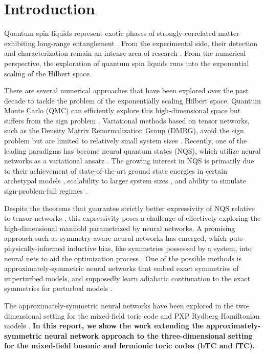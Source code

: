 \documentclass[
  aps,            %
  prl,            %
  reprint,        %
  groupedaddress, %
  amsmath,amssymb,
  floatfix,       %
  nofootinbib,    %
  longbibliography %
]{revtex4-2}
\newcommand{\todo}[1]{\textcolor{red}{\textbf{[TODO: #1]}}}
\begin{document}
\section{Introduction}
Quantum spin liquids represent exotic phases of strongly-correlated matter exhibiting long-range entanglement \cite{kitaev2003,savary2017}. From the experimental side, their detection and characterization remain an intense area of research \cite{satzinger2021,semeghini2021}. From the numerical perspective, the exploration of quantum spin liquids runs into the exponential scaling of the Hilbert space.


There are several numerical approaches that have been explored over the past decade to tackle the problem of the exponentially scaling Hilbert space. Quantum Monte Carlo (QMC) can efficiently explore this high-dimensional space but suffers from the sign problem \cite{troyer2005}. Variational methods based on tensor networks, such as the Density Matrix Renormalization Group (DMRG), avoid the sign problem but are limited to relatively small system sizes \cite{white1992}. Recently, one of the leading paradigms has become neural quantum states (NQS), which utilize neural networks as a variational ansatz \cite{carleo2017}. The growing interest in NQS is primarily due to their achievement of state-of-the-art ground state energies in certain archetypal models \cite{chen2024}, scalability to larger system sizes \cite{chen2024}, and ability to simulate sign-problem-full regimes \cite{szabo2020}.


Despite the theorems that guarantee strictly better expressivity of NQS relative to tensor networks \cite{sharir2022}, this expressivity poses a challenge of effectively exploring the high-dimensional manifold parametrized by neural networks. A promising approach such as symmetry-aware neural networks has emerged, which puts physically-informed inductive bias, like symmetries possessed by a system, into neural nets to aid the optimization process \cite{luo2021prl}. One of the possible methods is approximately-symmetric neural networks that embed exact symmetries of unperturbed models, and supposedly learn adiabatic continuation to the exact symmetries for perturbed models \cite{kufel2024}.

The approximately-symmetric neural networks have been explored in the two-dimensional setting for the mixed-field toric code and PXP Rydberg Hamiltonian models \cite{kufel2024}. \textbf{In this report, we show the work extending the approximately-symmetric neural network approach to the three-dimensional setting for the mixed-field bosonic and fermionic toric codes (bTC and fTC).}
\end{document}
